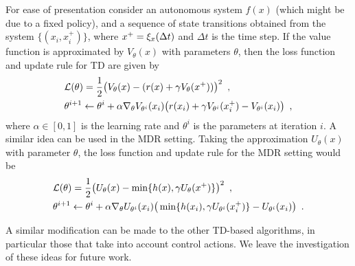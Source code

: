 For ease of presentation consider an autonomous system $f(x)$ (which might be due to a fixed policy), and a sequence of state transitions obtained from the system $\{(x_i,x_i^+)\}$, where $x^+=\xi_x(\Delta t)$ and $\Delta t$ is the time step. If the value function is approximated by $V_\theta(x)$ with parameters $\theta$, then the loss function and update rule for TD are given by
%
\begin{equation}
\begin{split}
&\mathcal{L}(\theta)=\frac{1}{2}\big(V_{\theta}(x) - (r(x)+\gamma V_{\theta}(x^+))\big)^2 \enspace,\\
&\theta^{i+1} \leftarrow \theta^i + \alpha \nabla_{\theta}V_{\theta^i}(x_i)\big(r(x_i)+\gamma V_{\theta^i}(x^+_i) - V_{\theta^i}(x_i)\big)\enspace,
\end{split}
\end{equation}%
\noindent where $\alpha \in [0,1]$ is the learning rate and $\theta^i$ is the parameters at iteration $i$. A similar idea can be used in the MDR setting. Taking the approximation $U_\theta(x)$ with parameter $\theta$, the loss function and update rule for the MDR setting would be
%
\begin{equation}
\begin{split}
&\mathcal{L}(\theta)=\frac{1}{2}\big(U_{\theta}(x) - \min\{h(x),\gamma U_{\theta}(x^+)\}\big)^2\enspace,\\
&\theta^{i+1} \leftarrow \theta^i + \alpha\nabla_{\theta}U_{\theta^i}(x_i)\big(\min\{h(x_i),\gamma U_{\theta^i}(x^+_i)\} - U_{\theta^i}(x_i)\big)\enspace.
\end{split}
\end{equation}

A similar modification can be made to the other TD-based algorithms, in particular those that take into account control actions. We leave the investigation of these ideas for future work. 




